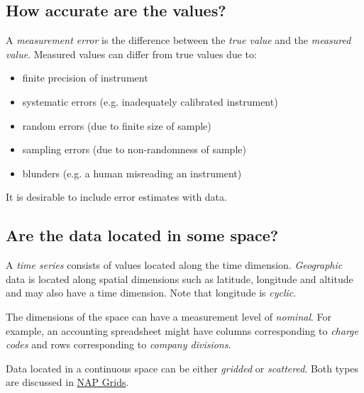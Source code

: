   \subsection{How accurate are the values?}

  \par A 
  \textit{measurement error} is the difference between the 
  \textit{true value} and the 
  \textit{measured value}. Measured values can differ from true values
  due to:
  \begin{itemize}
    \item finite precision of instrument
    \item systematic errors (e.g. inadequately calibrated
    instrument)
    \item random errors (due to finite size of sample)
    \item sampling errors (due to non-randomness of sample)
    \item blunders (e.g. a human misreading an instrument)
  \end{itemize}It is desirable to include error estimates with data.
  \subsection{Are the data located in some space?}

  \par A 
  \textit{time series} consists of values located along the time
  dimension. 
  \textit{Geographic} data is located along spatial dimensions such as
  latitude, longitude and altitude and may also have a time dimension.
  Note that longitude is 
  \textit{cyclic}.
  \par The dimensions of the space can have a measurement level of 
  \textit{nominal}. For example, an accounting spreadsheet might have
  columns corresponding to 
  \textit{charge codes} and rows corresponding to 
  \textit{company divisions}.
  \par Data located in a continuous space can be either 
  \textit{gridded} or 
  \textit{scattered}. Both types are discussed in 
  \href{grid.html}{NAP Grids}.
